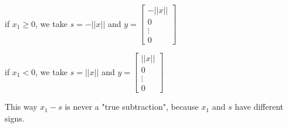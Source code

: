 \documentclass[10pt]{report}
\begin{document}
\begin{list}{}{}
	\item if $x_1 \geq 0$, we take $s = -||x||$ and $y = \left[\begin{array}{c}
	-||x||\\0\\\vdots\\0
	\end{array}\right]$
	\item if $x_1 < 0$, we take $s = ||x||$ and $y = \left[\begin{array}{c}
	||x||\\0\\\vdots\\0
	\end{array}\right]$
\end{list}
This way $x_1 - s$ is never a "true subtraction", because $x_1$ and $s$ have different signs.
\end{document}
